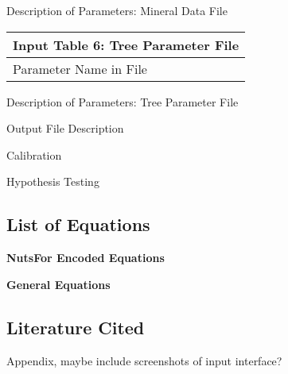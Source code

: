 \documentclass[
]{article}
\begin{document}
Description of Parameters: Mineral Data File

\begin{longtable}[]{@{}l@{}}
\toprule
Input Table 6: Tree Parameter File\tabularnewline
\midrule
\endhead
Parameter Name in File\tabularnewline
\bottomrule
\end{longtable}

Description of Parameters: Tree Parameter File

Output File Description

Calibration

Hypothesis Testing

\hypertarget{list-of-equations}{%
\subsection{List of Equations}\label{list-of-equations}}

\textbf{NutsFor Encoded Equations}

\textbf{General Equations}

\hypertarget{literature-cited}{%
\subsection{Literature Cited}\label{literature-cited}}

Appendix, maybe include screenshots of input interface?
\end{document}
